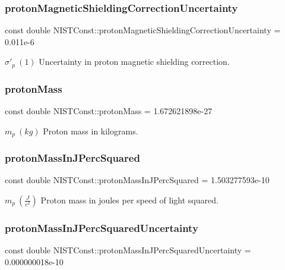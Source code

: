 \subsubsection{\texorpdfstring{proton\+Magnetic\+Shielding\+Correction\+Uncertainty}{protonMagneticShieldingCorrectionUncertainty}}
{\footnotesize\ttfamily const double N\+I\+S\+T\+Const\+::proton\+Magnetic\+Shielding\+Correction\+Uncertainty = 0.\+011e-\/6}

$\sigma'_p \ (1)$ Uncertainty in proton magnetic shielding correction. \mbox{\label{group___proton_gaa6738785a6bf04323231318dd6b2ed90}} 
\subsubsection{\texorpdfstring{proton\+Mass}{protonMass}}
{\footnotesize\ttfamily const double N\+I\+S\+T\+Const\+::proton\+Mass = 1.\+672621898e-\/27}

$m_p \ (kg)$ Proton mass in kilograms. \mbox{\label{group___proton_gae46a62aa4ccd40b74db6a45a3933cf0f}} 
\subsubsection{\texorpdfstring{proton\+Mass\+In\+J\+Perc\+Squared}{protonMassInJPercSquared}}
{\footnotesize\ttfamily const double N\+I\+S\+T\+Const\+::proton\+Mass\+In\+J\+Perc\+Squared = 1.\+503277593e-\/10}

$m_p \ (\frac{J}{c^2})$ Proton mass in joules per speed of light squared. \mbox{\label{group___proton_ga192b0caed878dce33d9f2f05470577d0}} 
\subsubsection{\texorpdfstring{proton\+Mass\+In\+J\+Perc\+Squared\+Uncertainty}{protonMassInJPercSquaredUncertainty}}
{\footnotesize\ttfamily const double N\+I\+S\+T\+Const\+::proton\+Mass\+In\+J\+Perc\+Squared\+Uncertainty = 0.\+000000018e-\/10}

